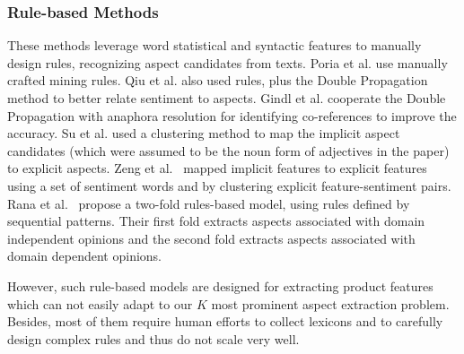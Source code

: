 \subsubsection{Rule-based Methods}
These methods leverage word statistical and 
syntactic features to manually design rules, recognizing aspect candidates 
from texts.
Poria et al.  use manually crafted mining rules. 
Qiu et al.  also used rules, plus the 
Double Propagation method to better relate sentiment to aspects. 
Gindl et al.  cooperate the Double Propagation 
 with anaphora resolution for identifying 
co-references to improve the accuracy. 
Su et al.  used a clustering method to map 
the implicit aspect candidates (which were assumed to be the noun form 
of adjectives in the paper) to explicit aspects. 
Zeng et al.~ mapped implicit features 
to explicit features using a set of sentiment words and by clustering 
explicit feature-sentiment pairs.
Rana et al.~ propose a two-fold rules-based model, 
using rules defined by sequential patterns. Their first fold extracts aspects 
associated with domain independent opinions and the 
second fold extracts aspects 
associated with domain dependent opinions. 

However, such rule-based models are designed for extracting product 
features which can not easily adapt to our $K$ most prominent 
aspect extraction problem. Besides, most of them require human efforts 
to collect lexicons and to carefully design complex rules and 
thus do not scale very well. 

